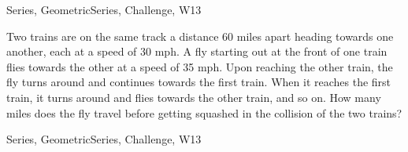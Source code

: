  

\begin{tagblock}{Series, GeometricSeries, Challenge, W13}
\begin{question}

Two trains are on the same track a distance 60 miles apart heading towards one another, each at a speed of 30 mph. A fly starting out at the front of one train flies towards the other at a speed of 35 mph. Upon reaching the other train, the fly turns around and continues towards the first train. When it reaches the first train, it turns around and flies towards the other train, and so on. How many miles does the fly travel before getting squashed in the collision of the two trains?
	
	
\begin{tags}
	    Series, GeometricSeries, Challenge, W13
\end{tags}
	
\begin{diary}
	    
\end{diary}
	
\begin{solution}
	   
\end{solution}
	
\end{question}

\end{tagblock}


 

